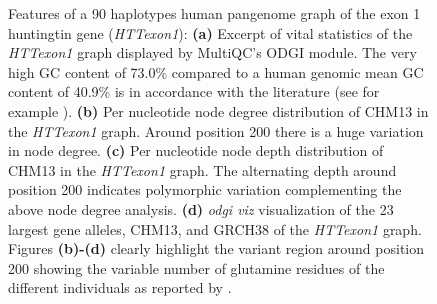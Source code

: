 \begin{figure}[h!]
	\caption{Features of a 90 haplotypes human pangenome graph of the exon 1 huntingtin gene (\textit{HTTexon1}): \textbf{(a)} Excerpt of vital statistics of the \textit{HTTexon1} graph displayed by MultiQC's ODGI module. The very high GC content of 73.0\% compared to a human genomic mean GC content of 40.9\% \cite{Piovesan2019} is in accordance with the literature (see for example \cite{Sathasivam2013, Neueder2017}). \textbf{(b)} Per nucleotide node degree distribution of CHM13 in the \textit{HTTexon1} graph. Around position 200 there is a huge variation in node degree. \textbf{(c)} Per nucleotide node depth distribution of CHM13 in the \textit{HTTexon1} graph. The alternating depth around position 200 indicates polymorphic variation complementing the above node degree analysis. \textbf{(d)} \textit{odgi viz} visualization of the 23 largest gene alleles, CHM13, and GRCH38 of the \textit{HTTexon1} graph. Figures \textbf{(b)-(d)} clearly highlight the variant region around position 200 showing the variable number of glutamine residues of the different individuals as reported by \cite{Nance1999}.}
	\label{fig:metrics}
\end{figure}
